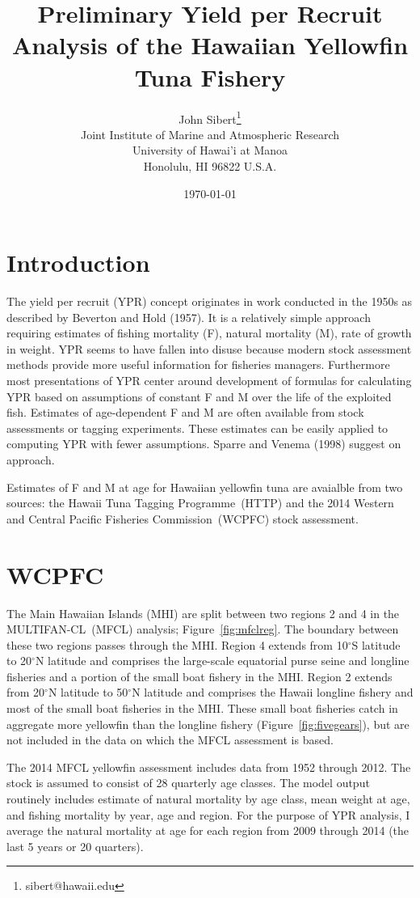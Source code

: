 \documentclass[12pt,letterpaper]{article}
\title{Preliminary Yield per Recruit Analysis of the Hawaiian
Yellowfin Tuna Fishery}
\author{
John Sibert\thanks{sibert@hawaii.edu}\\
Joint Institute of Marine and Atmospheric Research\\
University of Hawai'i at Manoa\\
Honolulu, HI  96822 U.S.A.\\[0.125in]
\date{\today}
}
\newcommand\doublespacing{\baselineskip=1.6\normalbaselineskip}
\renewcommand\deg[1]{$^\circ$#1}
\newcommand\MFCL{MULTIFAN-CL}
\newcommand\HTTP{Hawaii Tuna Tagging Programme}
\newcommand\WCPFC{Western and Central Pacific Fisheries Commission}
\begin{document}
\maketitle

\doublespacing

\section*{Introduction}
The yield per recruit (YPR) concept originates in work conducted in the 1950s
as described by Beverton and Hold (1957). It is a relatively simple
approach requiring estimates of fishing mortality (F), natural
mortality (M), rate of growth in weight. YPR seems to have fallen into
disuse because modern stock assessment methods provide more useful
information for fisheries managers. Furthermore most presentations of
YPR center around development of formulas for calculating YPR based on
assumptions of constant F and M over the life of the exploited fish.
Estimates of age-dependent F and M are often available from stock
assessments or tagging experiments. These estimates can be easily
applied to computing YPR with fewer assumptions. Sparre and Venema
(1998) suggest on approach.

Estimates of F and M at age for Hawaiian yellowfin tuna are avaialble
from two sources: the \HTTP\ (HTTP) and the 2014 \WCPFC\ (WCPFC) stock
assessment.

\section*{WCPFC}
The Main Hawaiian Islands (MHI) are split between two regions 2 and 4
in the \MFCL\ (MFCL) analysis; Figure~\ref{fig:mfclreg}. The boundary between
these two regions passes through the MHI. Region 4 extends from
10\deg{S} latitude to 20\deg{N} latitude and comprises
the large-scale equatorial purse seine and longline fisheries and a
portion of the small boat fishery in the MHI. 
Region 2 extends from 20\deg{N} latitude to 50\deg{N} latitude
and comprises the Hawaii longline fishery 
and most of the small boat fisheries in the MHI.
These small boat fisheries catch in aggregate more yellowfin than the longline
fishery (Figure~\ref{fig:fivegears}), but are not included in the data
on which the MFCL assessment is based.

The 2014 MFCL yellowfin assessment includes data from 1952 through
2012. The stock is assumed to consist of 28 quarterly age classes. The
model output routinely includes estimate of natural mortality by age
class, mean weight at age, and fishing mortality by year, age and
region. For the purpose of YPR analysis, I average the natural
mortality at age for each region from 2009 through 2014 (the last 5
years or 20 quarters). 
\end{document}
